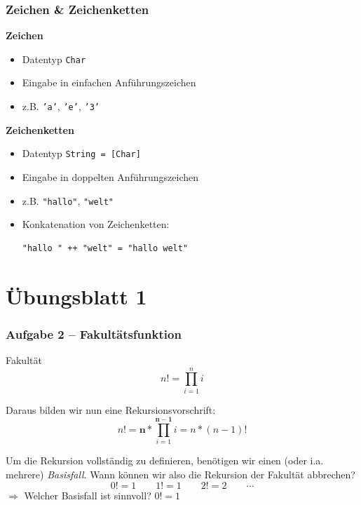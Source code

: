 \documentclass{beamer}
\begin{document}
	\begin{frame}[fragile] \frametitle{Zeichen \& Zeichenketten}
		\textbf{Zeichen}
		\begin{itemize}
			\item Datentyp \texttt{Char}
			\item Eingabe in einfachen Anführungszeichen
			\item z.B. \texttt{'a'}, \texttt{'e'}, \texttt{'3'}
		\end{itemize}
	
		\textbf{Zeichenketten}
		\begin{itemize}
			\item Datentyp \texttt{String = [Char]}
			\item Eingabe in doppelten Anführungszeichen
			\item z.B. \texttt{"hallo"}, \texttt{"welt"}
			\item Konkatenation von Zeichenketten: 
			\begin{lstlisting}[basicstyle=\ttfamily, numbers=none, frame=none, showstringspaces=false]
"hallo " ++ "welt" = "hallo welt"
			\end{lstlisting}
		\end{itemize}
	\end{frame}


\section{Übungsblatt 1}

\begin{frame}\frametitle{Aufgabe 2 -- Fakultätsfunktion}
	Fakultät
	\begin{equation*}
		n! = \prod_{i=1}^n i
	\end{equation*}
	
	\medskip
	\pause
	
	Daraus bilden wir nun eine Rekursionsvorschrift:
	\begin{equation*}
		n! = \boldsymbol{n} * \prod_{i=1}^{\boldsymbol{n-1}} i= n * (n-1)!
	\end{equation*}
	
	\medskip
	\pause
	
	Um die Rekursion vollständig zu definieren, benötigen wir einen (oder i.a. mehrere) \emph{Basisfall}. Wann können wir also die Rekursion der Fakultät abbrechen?
	\begin{equation*}
	0 ! = 1 \qquad 1 ! = 1 \qquad 2! = 2 \qquad \cdots
	\end{equation*}
	$\Rightarrow$ Welcher Basisfall ist sinnvoll? \qquad $0! = 1$
\end{frame}
\end{document}
